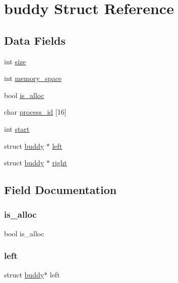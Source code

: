 \hypertarget{structbuddy}{}\section{buddy Struct Reference}
\label{structbuddy}
\subsection*{Data Fields}
\begin{DoxyCompactItemize}
\item 
int \hyperlink{structbuddy_a439227feff9d7f55384e8780cfc2eb82}{size}
\item 
int \hyperlink{structbuddy_a3da34b9c9f29cee0a0e7006f2f860c22}{memory\+\_\+space}
\item 
bool \hyperlink{structbuddy_af06203d2a7a670e12e043d6a8b591d2e}{is\+\_\+alloc}
\item 
char \hyperlink{structbuddy_ac7a4d007b168a6e4bbbe35881c60a477}{process\+\_\+id} \mbox{[}16\mbox{]}
\item 
int \hyperlink{structbuddy_a37722a150250e2a5a98e5e0d11e53449}{start}
\item 
struct \hyperlink{structbuddy}{buddy} $\ast$ \hyperlink{structbuddy_a339c47373fbeea5a8c35a2e2803c166d}{left}
\item 
struct \hyperlink{structbuddy}{buddy} $\ast$ \hyperlink{structbuddy_a028e12f4d275e9ff96ca3cc8599fc1da}{right}
\end{DoxyCompactItemize}


\subsection{Field Documentation}
\mbox{\label{structbuddy_af06203d2a7a670e12e043d6a8b591d2e}} 
\subsubsection{\texorpdfstring{is\+\_\+alloc}{is\_alloc}}
{\footnotesize\ttfamily bool is\+\_\+alloc}

\mbox{\label{structbuddy_a339c47373fbeea5a8c35a2e2803c166d}} 
\subsubsection{\texorpdfstring{left}{left}}
{\footnotesize\ttfamily struct \hyperlink{structbuddy}{buddy}$\ast$ left}

